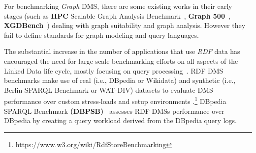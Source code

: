 \documentclass{llncs}
\begin{document}
    For benchmarking \textit{Graph} DMS, there are some existing works in their early stages (such as \textbf{HPC} Scalable Graph Analysis Benchmark~\cite{Dominguez-Sal:2010:SGD:1927585.1927590}, \textbf{Graph 500}~\cite{murphy2010introducing}, \textbf{XGDBench}~\cite{conf/cloudcom/DayarathnaS12}) dealing with graph suitability and graph analysis.
    However they fail to define standards for graph modeling and query languages.
    
    The substantial increase in the number of applications that use \textit{RDF} data has encouraged the need for large scale benchmarking efforts on all aspects of the Linked Data life cycle, mostly focusing on query processing~\cite{ngomo2016hobbit}.
    RDF DMS benchmarks make use of real (i.e., DBpedia or Wikidata) and synthetic (i.e., Berlin SPARQL Benchmark or WAT-DIV) datasets to evaluate DMS performance over custom stress-loads and setup environments \cite{fineeval}.\footnote{https://www.w3.org/wiki/RdfStoreBenchmarking}
    DBpedia SPARQL Benchmark \textbf{(DBPSB)}~\cite{Morsey2011} assesses RDF DMSs performance over DBpedia by creating a query workload derived from the DBpedia query logs. 
    
\end{document}
